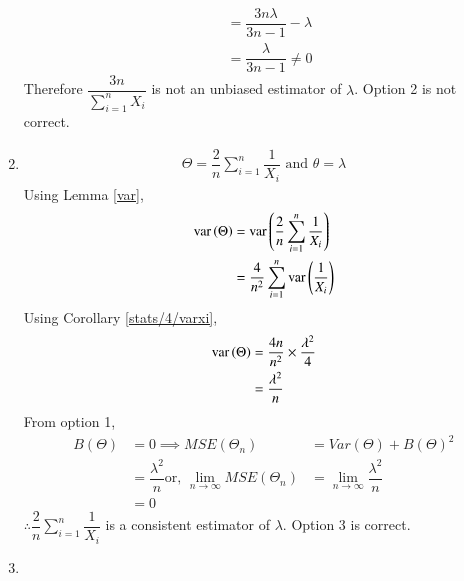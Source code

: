 \begin{enumerate}
\begin{align}
            &= \dfrac{3n\lambda}{3n-1} - \lambda \\
            &= \dfrac{\lambda}{3n-1} \neq 0
        \end{align}
        Therefore $ \dfrac{3n}{\sum_{i=1}^{n} X_i } $ is not an unbiased estimator of $ \lambda$.
        Option 2 is not correct. 
        \item
         \begin{align}
             \Theta = \dfrac{2}{n} \sum_{i=1}^{n} \dfrac{1}{X_i} \text{  and  }
             \theta = \lambda
         \end{align}
Using Lemma \ref{var},
        \begin{align}
            \text{var}\left( \Theta \right) &= \text{var}\left( \dfrac{2}{n} \sum_{i=1}^{n} \dfrac{1}{X_i}  \right) \\
            & = \dfrac{4}{n^2} \sum_{i=1}^{n} \text{var}\left( \dfrac{1}{X_i} \right) 
            \label{eq3}
        \end{align}
        Using Corollary \ref{stats/4/varxi},
        \begin{align}
         \text{var}\left( \Theta \right)   & = \dfrac{4n}{n^2} \times \dfrac{\lambda^2}{4} \\
            &= \dfrac{\lambda^2}{n}
        \end{align}
From  option 1, 
        \begin{align}
            B(\Theta) &= 0
\implies             MSE(\Theta_n) &= Var(\Theta) + B(\Theta)^2 \\
            &= \dfrac{\lambda^2}{n}
\text{or, }             \lim_{n\to\infty} MSE( \Theta_n) &=    \lim_{n\to\infty} \dfrac{\lambda^2}{n} \\
              &= 0
        \end{align}
        $\therefore \dfrac{2}{n} \sum_{i=1}^{n} \dfrac{1}{X_i} $ is a consistent estimator of $ \lambda$. 
        Option 3 is correct. 
        \item 
        

\end{enumerate}
